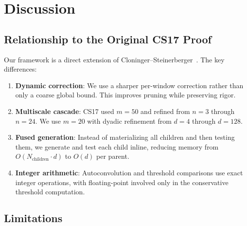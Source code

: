 \documentclass[11pt, letterpaper]{article}
\theoremstyle{paperplain}
\theoremstyle{paperdef}
\begin{document}
\section{Discussion}\label{sec:discussion}

\subsection{Relationship to the Original CS17 Proof}

Our framework is a direct extension of
Cloninger--Steinerberger~\cite{CS17}.  The key differences:

\begin{enumerate}
  \item \textbf{Dynamic correction}: We use a sharper per-window
    correction rather than only a coarse global bound.  This improves
    pruning while preserving rigor.

  \item \textbf{Multiscale cascade}: CS17 used $m = 50$ and refined
    from $n = 3$ through $n = 24$.  We use $m = 20$ with dyadic
    refinement from $d = 4$ through $d = 128$.

  \item \textbf{Fused generation}: Instead of materializing all
    children and then testing them, we generate and test each child
    inline, reducing memory from $O(N_{\text{children}} \cdot d)$ to
    $O(d)$ per parent.

  \item \textbf{Integer arithmetic}: Autoconvolution and threshold
    comparisons use exact integer operations, with floating-point
    involved only in the conservative threshold computation.
\end{enumerate}

\subsection{Limitations}
\end{document}
